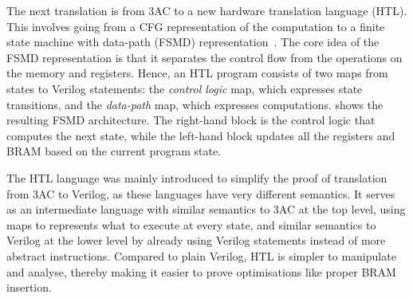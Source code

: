 The next translation is from 3AC to a new hardware translation language (HTL). %
This involves going from a CFG representation of the computation to a finite state machine with data-path (FSMD) representation~\cite{hwang99_fsmd}. The core idea of the FSMD representation is that it separates the control flow from the operations on the memory and registers. %
Hence, an HTL program consists of two maps from states to Verilog statements:
the \emph{control logic} map, which expresses state transitions, and the
\emph{data-path} map, which expresses computations.
 shows the resulting FSMD architecture. The
right-hand block is the control logic that computes the next state, while the
left-hand block updates all the registers and \gls{BRAM} based on the current
program state.

The HTL language was mainly introduced to simplify the proof of translation from 3AC to Verilog, as these languages have very different semantics.
It serves as an intermediate language with similar semantics to 3AC at the top level, using maps to represents what to execute at every state, and similar semantics to Verilog at the lower level by already using Verilog statements instead of more abstract instructions.
Compared to plain Verilog, HTL is simpler to manipulate and analyse, thereby making it easier to prove optimisations like proper \gls{BRAM} insertion.

